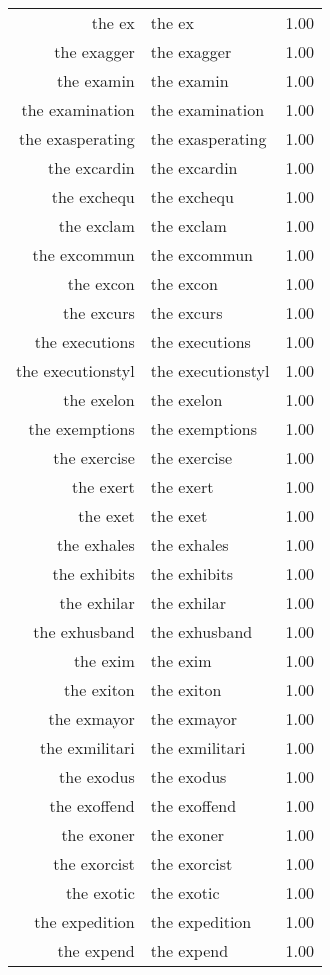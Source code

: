 \begin{table}[ht]
\begin{tabular}{rlr}
  the ex & the ex & 1.00 \\ 
  the exagger & the exagger & 1.00 \\ 
  the examin & the examin & 1.00 \\ 
  the examination & the examination & 1.00 \\ 
  the exasperating & the exasperating & 1.00 \\ 
  the excardin & the excardin & 1.00 \\ 
  the exchequ & the exchequ & 1.00 \\ 
  the exclam & the exclam & 1.00 \\ 
  the excommun & the excommun & 1.00 \\ 
  the excon & the excon & 1.00 \\ 
  the excurs & the excurs & 1.00 \\ 
  the executions & the executions & 1.00 \\ 
  the executionstyl & the executionstyl & 1.00 \\ 
  the exelon & the exelon & 1.00 \\ 
  the exemptions & the exemptions & 1.00 \\ 
  the exercise & the exercise & 1.00 \\ 
  the exert & the exert & 1.00 \\ 
  the exet & the exet & 1.00 \\ 
  the exhales & the exhales & 1.00 \\ 
  the exhibits & the exhibits & 1.00 \\ 
  the exhilar & the exhilar & 1.00 \\ 
  the exhusband & the exhusband & 1.00 \\ 
  the exim & the exim & 1.00 \\ 
  the exiton & the exiton & 1.00 \\ 
  the exmayor & the exmayor & 1.00 \\ 
  the exmilitari & the exmilitari & 1.00 \\ 
  the exodus & the exodus & 1.00 \\ 
  the exoffend & the exoffend & 1.00 \\ 
  the exoner & the exoner & 1.00 \\ 
  the exorcist & the exorcist & 1.00 \\ 
  the exotic & the exotic & 1.00 \\ 
  the expedition & the expedition & 1.00 \\ 
  the expend & the expend & 1.00 \\ 

\end{tabular}
\end{table}
